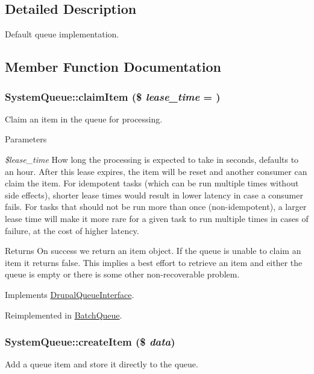 \subsection{Detailed Description}
Default queue implementation. 

\subsection{Member Function Documentation}
\hypertarget{classSystemQueue_aa5f774d4ef4b31f1318751d9b9872071}{
\subsubsection[{claimItem}]{\setlength{\rightskip}{0pt plus 5cm}SystemQueue::claimItem (\$ {\em lease\_\-time} = {})}}
\label{classSystemQueue_aa5f774d4ef4b31f1318751d9b9872071}
Claim an item in the queue for processing.


\begin{DoxyParams}{Parameters}
\item[{\em \$lease\_\-time}]How long the processing is expected to take in seconds, defaults to an hour. After this lease expires, the item will be reset and another consumer can claim the item. For idempotent tasks (which can be run multiple times without side effects), shorter lease times would result in lower latency in case a consumer fails. For tasks that should not be run more than once (non-\/idempotent), a larger lease time will make it more rare for a given task to run multiple times in cases of failure, at the cost of higher latency. \end{DoxyParams}
\begin{DoxyReturn}{Returns}
On success we return an item object. If the queue is unable to claim an item it returns false. This implies a best effort to retrieve an item and either the queue is empty or there is some other non-\/recoverable problem. 
\end{DoxyReturn}


Implements \hyperlink{interfaceDrupalQueueInterface_a2f0f2ccc1f4d55c0890897ea85e75954}{DrupalQueueInterface}.

Reimplemented in \hyperlink{classBatchQueue_a489fb34e9fe09e9434d81a3fba605d97}{BatchQueue}.\hypertarget{classSystemQueue_abf9ce9dc71e435f3fc0471e2187730a3}{
\subsubsection[{createItem}]{\setlength{\rightskip}{0pt plus 5cm}SystemQueue::createItem (\$ {\em data})}}
\label{classSystemQueue_abf9ce9dc71e435f3fc0471e2187730a3}
Add a queue item and store it directly to the queue.


